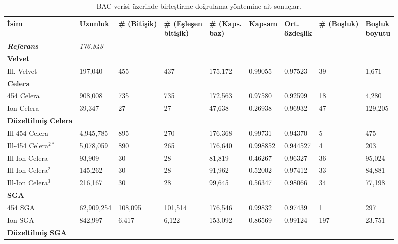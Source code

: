 \begin{table}[htb]
\begin{center}
\caption{BAC verisi üzerinde birleştirme doğrulama yöntemine ait sonuçlar.}
\label{tab:resultsTable}
{\footnotesize
\begin{tabular}{|l|l|l|l|l|l|l|l|l|}
\hline
         İsim & Uzunluk & \# (Bitişik) & \thead{\# (Eşleşen \\ bitişik)} & \thead{\# (Kaps.\\ baz)} & Kapsam & \thead{Ort. \\özdeşlik} & \# (Boşluk) & \thead{Boşluk \\ boyutu} \\
\hline
	 \textbf{\textit{Referans}} & \textit{176.843} & & & & & & & \\
\hline	 
	 \textbf{Velvet} & & & & & & & & \\
         Ill. Velvet & 197,040 & 455 & 437 & 175,172 & 0.99055 & 0.97523 & 39 & 1,671 \\
         \textbf{Celera} & & & & & & & & \\       
         454 Celera & 908,008 & 735 & 735 & 172,563 & 0.97580 & 0.92599 & 18 & 4,280 \\
         Ion Celera & 39,347 & 27 & 27 & 47,638 & 0.26938 & 0.96932 & 47 & 129,205 \\
         \hline   
         \textbf{Düzeltilmiş Celera} & & & & & & & & \\
         Ill-454 Celera & 4,945,785 & 895 & 270 & 176,368 & 0.99731 & 0.94370 & 5 & 475 \\
         Ill-454 Celera$^{2*}$ & 5,078,059 & 890 & 265 & 176,640 & 0.998852 & 0.944527 & 4 & 203 \\
         Ill-Ion Celera & 93,909 & 30 & 28 & 81,819 & 0.46267 & 0.96327 & 36 & 95,024 \\
         Ill-Ion Celera$^2$ & 145,262 & 30 & 28 & 91,962 & 0.52002 & 0.97412 & 33 & 84,881 \\
         Ill-Ion Celera$^3$ & 216,167 & 30 & 28 & 99,645 & 0.56347 & 0.98066 & 34 & 77,198 \\
         \textbf{SGA} & & & & & & & & \\
         454 SGA & 62,909,254 & 108,095 & 101,514 & 176,546 & 0.99832 & 0.97439 & 1 & 297 \\
         Ion SGA & 842,997 & 6,417 & 6,122 & 153,092 & 0.86569 & 0.99124 & 197 & 23.751 \\	
         \hline
         \textbf{Düzeltilmiş SGA} & & & & & & & & \\

\end{tabular}}
\end{center}
\end{table}

